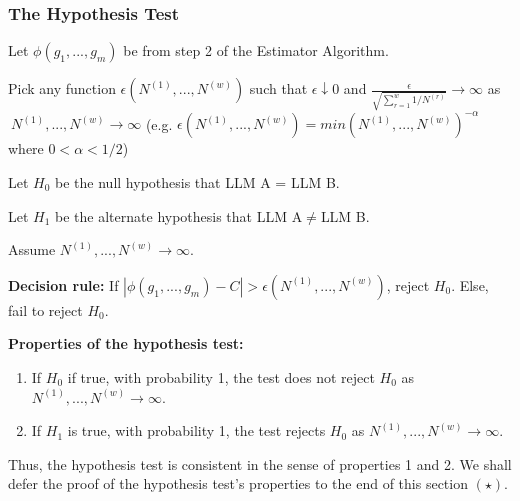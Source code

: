 \documentclass{article}
\begin{document}
\subsubsection{The Hypothesis Test}

Let $\displaystyle \phi \left( g_{1} ,...,g_{m}\right)$ be from step 2 of the Estimator Algorithm.

Pick any function $\displaystyle \epsilon \left( N^{\left( 1\right)} ,...,N^{\left( w\right)}\right)$ such that $\displaystyle \epsilon \downarrow 0$ and $\displaystyle \frac{\epsilon }{\sqrt{\sum _{r=1}^{w} 1/N^{\left( r\right)}}}\rightarrow \infty $ as $\displaystyle \ N^{\left( 1\right)} ,...,N^{\left( w\right)}\rightarrow \infty $ (e.g. $\displaystyle \epsilon \left( N^{\left( 1\right)} ,...,N^{\left( w\right)}\right) =min\left( N^{\left( 1\right)} ,...,N^{\left( w\right)}\right)^{-\alpha }$ where $\displaystyle 0< \alpha < 1/2$)

Let $\displaystyle H_{0}$ be the null hypothesis that LLM A = LLM B.

Let $\displaystyle H_{1}$ be the alternate hypothesis that LLM A$\displaystyle \neq $LLM B.

Assume $\displaystyle N^{\left( 1\right)} ,...,N^{\left( w\right)}\rightarrow \infty $.



\textbf{Decision rule:} If $\displaystyle |\phi \left( g_{1} ,...,g_{m}\right) -C| >\epsilon \left( N^{\left( 1\right)} ,...,N^{\left( w\right)}\right)$, reject $\displaystyle H_{0}$. Else, fail to reject $\displaystyle H_{0}$.



\textbf{Properties of the hypothesis test:}
\begin{enumerate}
\item If $\displaystyle H_{0}$ if true, with probability 1, the test does not reject $\displaystyle H_{0}$ as $\displaystyle N^{\left( 1\right)} ,...,N^{\left( w\right)}\rightarrow \infty $.
\item If $\displaystyle H_{1}$ is true, with probability 1, the test rejects $\displaystyle H_{0}$ as $\displaystyle N^{\left( 1\right)} ,...,N^{\left( w\right)}\rightarrow \infty $.
\end{enumerate}

Thus, the hypothesis test is consistent in the sense of properties 1 and 2. We shall defer the proof of the hypothesis test's properties to the end of this section $\displaystyle \left( \star \right)$.
\end{document}
